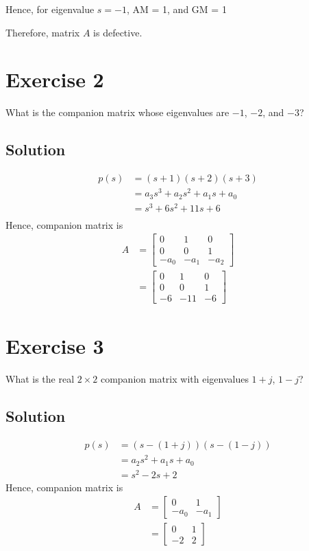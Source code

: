 \documentclass[12pt,a4paper]{article}
\begin{document}
Hence, for eigenvalue $ s= -1$, AM = 1, and GM = 1

Therefore, matrix $A$ is defective.
\vspace{0.25cm}

\section*{Exercise 2}
What is the companion matrix whose eigenvalues are $-1$, $-2$, and $-3$?
\subsection*{Solution}

\begin{align*}
	p(s) &= (s + 1 )(s + 2) (s + 3) \\
	&= a_3 s^3 + a_2 s^2 + a_1s + a_0 \\
	&= s^3 + 6s^2 + 11 s + 6 \\
\end{align*}
Hence, companion matrix is 
\begin{align*}
	A &= \begin{bmatrix}
		0 & 1 & 0 \\
		0 & 0 & 1 \\
		-a_0 & -a_1 & -a_2
	\end{bmatrix} \\
	&= \begin{bmatrix}
		0 & 1 & 0 \\
		0 & 0 & 1 \\
		-6 & -11 & -6
	\end{bmatrix}
\end{align*}

\section*{Exercise 3}
What is the real $2\times2$ companion matrix with eigenvalues $1+j$, $1-j$?
\subsection*{Solution}
\begin{align*}
	p(s) &= (s - (1 + j)) (s - (1 - j)) \\
	&= a_2 s^2 + a_1 s + a_0 \\
	&=  s^2 - 2s + 2
\end{align*}
Hence, companion matrix is  
\begin{align*}
	A &= \begin{bmatrix}
		0 & 1 \\
		-a_0 & -a_1
	\end{bmatrix} \\
	&= \begin{bmatrix}
		0 & 1 \\
		-2 & 2
	\end{bmatrix}
\end{align*}
\end{document}
